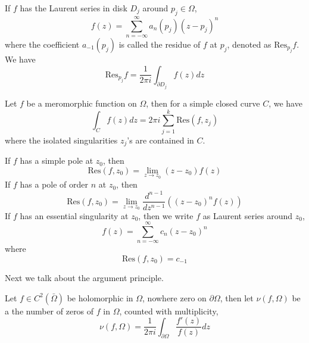 \documentclass[openany]{book}
\begin{document}
\begin{defn}
    If $f$ has the Laurent series in disk $D_j$ around $p_j\in\Omega$,
    \begin{equation*}
        f(z)=\sum_{n=-\infty}^\infty a_n(p_j)(z-p_j)^n
    \end{equation*}
    where the coefficient $a_{-1}(p_j)$ is called the residue of $f$ at $p_j$, denoted as $\text{Res}_{p_j}f$. We have 
    \begin{equation*}
        \text{Res}_{p_j}f=\frac{1}{2\pi i}\int_{\partial D_j}f(z)dz
    \end{equation*} 

\end{defn}


\begin{prop}
    Let $f$ be a meromorphic function on $\Omega$, then for a simple closed curve $C$, we have 
    \begin{equation*}
        \int_Cf(z)dz=2\pi i\sum_{j=1}^k\text{Res}(f,z_j)
    \end{equation*}
    where the isolated singularities $z_j$'s are contained in $C$.
\end{prop}


\begin{prop}[Residue]
    If $f$ has a simple pole at $z_0$, then 
    \begin{equation*}
        \text{Res}(f,z_0)=\lim_{z\to z_0}(z-z_0)f(z)
    \end{equation*}
    If $f$ has a pole of order $n$ at $z_0$, then
    \begin{equation*}
        \text{Res}(f,z_0)=\lim_{z\to z_0}\frac{d^{n-1}}{dz^{n-1}}\left((z-z_0)^nf(z)\right)
    \end{equation*}
    If $f$ has an essential singularity at $z_0$, then we write $f$ as Laurent series around $z_0$,
    \begin{equation*}
        f(z)=\sum_{n=-\infty}^\infty c_n(z-z_0)^n
    \end{equation*}
    where 
    \begin{equation*}
        \text{Res}(f,z_0)=c_{-1}
    \end{equation*}
\end{prop}




Next we talk about the argument principle.
\begin{prop}
    Let $f\in C^2(\bar{\Omega})$ be holomorphic in $\Omega$, nowhere zero on $\partial\Omega$, then let $\nu(f,\Omega)$ be a the number of zeros of $f$ in $\Omega$, counted with multiplicity, 
    \begin{equation*}
        \nu(f,\Omega)=\frac{1}{2\pi i}\int_{\partial\Omega}\frac{f'(z)}{f(z)}dz
    \end{equation*}
\end{prop}
\end{document}
